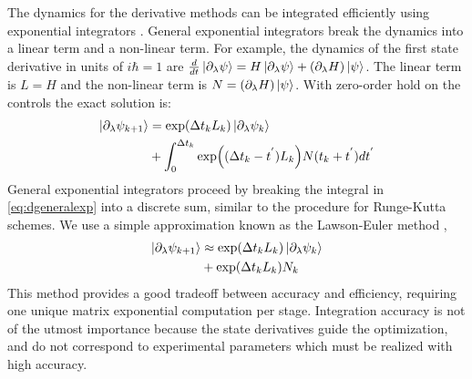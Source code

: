 The dynamics for the derivative methods can be integrated efficiently using exponential integrators
\cite{auer2018magnus, berland2005solving, einkemmer2017performance}.
General exponential integrators break the dynamics into a linear term and a non-linear term.
For example, the dynamics of the first state derivative in
units of $i\hbar = 1$ are $\frac{d}{dt} \ket{\partial_{\lambda} \psi} =
H \ket{\partial_{\lambda} \psi} + (\partial_{\lambda} H) \ket{\psi}$.
The linear term is $L = H$ and the non-linear term is $N = (\partial_{\lambda} H) \ket{\psi}$.
With zero-order hold on the controls the exact solution is:
\begin{equation}
  \label{eq:dgeneralexp}
  \begin{aligned}
    \ket{\partial_{\lambda} \psi_{k + 1}} &= \exp(\Delta t_{k} L_{k})
    \ket{\partial_{\lambda} \psi_{k}}\\
    &+ \int_{0}^{\Delta t_{k}} \exp((\Delta t_{k} - t^{'})L_{k})
    N(t_{k} + t^{'}) dt^{'}\\
  \end{aligned}
\end{equation}
General exponential integrators proceed by breaking the integral in \eqref{eq:dgeneralexp}
into a discrete sum, similar to the procedure
for Runge-Kutta schemes. We use a simple approximation known as the Lawson-Euler
method \cite{berland2005solving},
\begin{equation}
  \begin{aligned}
    \ket{\partial_{\lambda} \psi_{k + 1}} &\approx \exp(\Delta t_{k}L_{k}) \ket{\partial_{\lambda} \psi_{k}}\\
    &+ \exp(\Delta t_{k}L_{k}) N_{k}\\
  \end{aligned}
\end{equation}
This method provides a good tradeoff between accuracy and efficiency, requiring one unique matrix
exponential computation per stage. Integration accuracy is not of the utmost importance because the
state derivatives guide the optimization, and do not correspond to experimental parameters
which must be realized with high accuracy.




